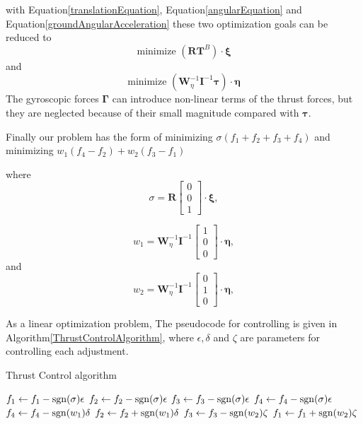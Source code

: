     with Equation\ref{translationEquation}, Equation\ref{angularEquation} and Equation\ref{groundAngularAcceleration} these two optimization goals can be reduced to
    \begin{equation}
        \text{minimize } (\boldsymbol{R} \boldsymbol{T}^{B}) \cdot \boldsymbol{\xi} 
    \end{equation}
    and
    \begin{equation}
        \text{minimize } (\boldsymbol{W}_{\eta}^{-1} \boldsymbol{I}^{-1} \boldsymbol{\tau}) \cdot \boldsymbol{\eta}
    \end{equation}
    The gyroscopic forces $\bm{\Gamma}$ can introduce non-linear terms of the thrust forces, but they are neglected because of their small magnitude compared with $\bm{\tau}$.
    

    Finally our problem has the form of minimizing $\sigma (f_1 + f_2 + f_3 + f_4)$ and minimizing $w_1 (f_4 - f_2) + w_2 (f_3 - f_1)$

    where
    \begin{equation}
        \sigma = \boldsymbol{R}\left[\begin{array}{c}
0 \\
0 \\
1
\end{array}\right] 
\cdot \boldsymbol{\xi},
    \end{equation}
    
    \begin{equation}
        w_1 = \boldsymbol{W}_{\eta}^{-1} \boldsymbol{I}^{-1}\left[\begin{array}{c}
1 \\
0 \\
0
\end{array}\right]\cdot \boldsymbol{\eta},
    \end{equation}
    and
    \begin{equation}
        w_2 = \boldsymbol{W}_{\eta}^{-1} \boldsymbol{I}^{-1}\left[\begin{array}{c}
0 \\
1 \\
0
\end{array}\right]\cdot \boldsymbol{\eta},
    \end{equation}

As a linear optimization problem, 
The pseudocode for controlling is given in Algorithm\ref{ThrustControlAlgorithm}, where $\epsilon, \delta$ and $\zeta$ are parameters for controlling each adjustment.
\begin{algorithm}
\caption{Thrust Control algorithm}
\label{ThrustControlAlgorithm}
\begin{algorithmic}[1]
\State $f_1 \gets f_1 - \operatorname{sgn}(\sigma) \epsilon$
\State $f_2 \gets f_2 - \operatorname{sgn}(\sigma) \epsilon$
\State $f_3 \gets f_3 - \operatorname{sgn}(\sigma) \epsilon$
\State $f_4 \gets f_4 - \operatorname{sgn}(\sigma) \epsilon$
\State $f_4 \gets f_4 - \operatorname{sgn}(w_1) \delta$
\State $f_2 \gets f_2 + \operatorname{sgn}(w_1) \delta$
\State $f_3 \gets f_3 - \operatorname{sgn}(w_2) \zeta$
\State $f_1 \gets f_1 + \operatorname{sgn}(w_2) \zeta$
\EndProcedure
\end{algorithmic}
\end{algorithm}


